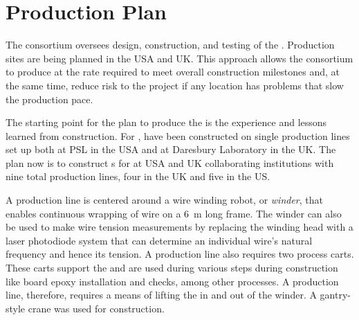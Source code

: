 \section{Production Plan}
\label{sec:fdsp-apa-prod}

The  consortium oversees design, construction, and testing of the   .  %
Production sites are being planned in the USA and UK. This approach allows the consortium to produce  at the rate required to meet overall construction milestones and, at the same time, reduce risk to the project if any location has problems that slow the production pace.

The starting point for the  plan to produce the  is the experience and lessons learned from  construction. For ,  have been constructed on single production lines set up both at PSL in the USA and at Daresbury Laboratory in the UK.  The plan now is to construct s for  at USA and UK collaborating institutions with nine total production lines, four in the UK and five in the US.  %

A production line is centered around a wire winding robot, or \textit{winder}, that enables continuous wrapping of wire on a \SI{6}{m} long frame. The winder can also be used to make wire tension measurements by replacing the winding head with a laser photodiode system that can determine an individual wire's natural frequency and hence its tension. A production line also requires two process carts. These carts support the  and are used during various steps during construction like board epoxy installation and  checks, among other processes. A production line, therefore, requires a means of lifting the  in and out of the winder. A gantry-style crane was used for  construction.

